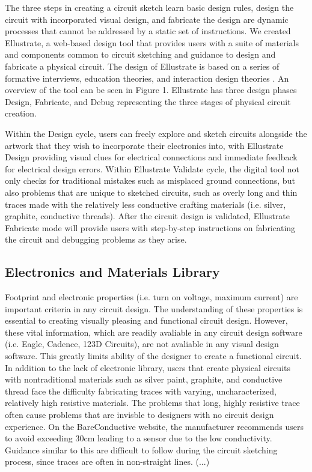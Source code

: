 \documentclass{sigchi}
\begin{document}
The three steps in creating a circuit sketch \textendash learn basic design rules, design the circuit with incorporated visual design, and fabricate the design \textendash are dynamic processes that cannot be addressed by a static set of instructions.
We created Ellustrate, a web-based design tool that provides users with a suite of materials and components common to circuit sketching and guidance to design and fabricate a physical circuit.
The design of Ellustrate is based on a series of formative interviews, education theories, and interaction design theories .
An overview of the tool can be seen in Figure 1. Ellustrate has three design phases \textendash Design, Fabricate, and Debug \textendash representing the three stages of physical circuit creation.

Within the Design cycle, users can freely explore and sketch circuits alongside the artwork that they wish to incorporate their electronics into, with Ellustrate Design providing visual clues for electrical connections and immediate feedback for electrical design errors.
Within Ellustrate Validate cycle, the digital tool not only checks for traditional mistakes such as misplaced ground connections, but also problems that are unique to sketched circuits, such as overly long and thin traces made with the relatively less conductive crafting materials (i.e. silver, graphite, conductive threads). After the circuit design is validated, Ellustrate Fabricate mode will provide users with step-by-step instructions on fabricating the circuit and debugging problems as they arise. 


\subsection{Electronics and Materials Library}
Footprint and electronic properties (i.e. turn on voltage, maximum current) are important criteria in any circuit design. The understanding of these properties is essential to creating visually pleasing and functional circuit design. However, these vital information, which are readily avaliable in any circuit design software (i.e. Eagle, Cadence, 123D Circuits), are not avaliable in any visual design software. This greatly limits ability of the designer to create a functional circuit. In addition to the lack of electronic library, users that create physical circuits with nontraditional materials such as silver paint, graphite, and conductive thread face the difficulty fabricating traces with varying, uncharacterized, relatively high resistive materials. The problems that long, highly resistive trace often cause problems that are invisble to designers with no circuit design experience. On the BareConductive website, the manufacturer recommends users to avoid exceeding 30cm leading to a sensor due to the low conductivity. Guidance similar to this are difficult to follow during the circuit sketching process, since traces are often in non-straight lines. (...)
\end{document}
